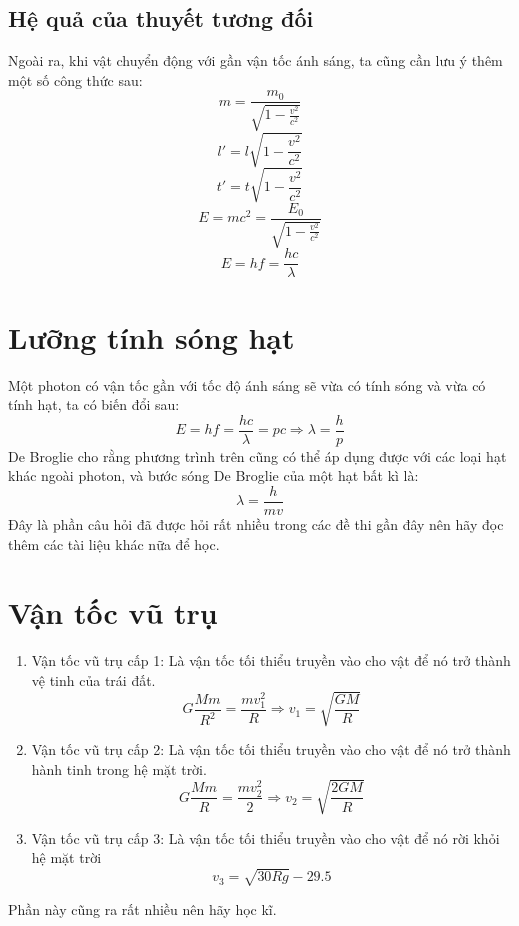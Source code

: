 \subsection{Hệ quả của thuyết tương đối}
Ngoài ra, khi vật chuyển động với gần vận tốc ánh sáng, ta cũng cần lưu ý thêm một số công thức sau:
$$m=\frac{m_{0}}{\sqrt{1-\frac{v^2}{c^2}}}$$
$$l'=l\sqrt{1-\frac{v^2}{c^2}}$$
$$t'=t\sqrt{1-\frac{v^2}{c^2}}$$
$$E=mc^2=\frac{E_{0}}{\sqrt{1-\frac{v^2}{c^2}}}$$
$$E=hf=\frac{hc}{\lambda}$$ 
\section{Lưỡng tính sóng hạt}
Một photon có vận tốc gần với tốc độ ánh sáng sẽ vừa có tính sóng và vừa có tính hạt, ta có biến đổi sau:
$$E=hf=\frac{hc}{\lambda}=pc\Rightarrow \lambda=\frac{h}{p}$$
De Broglie cho rằng phương trình trên cũng có thể áp dụng được với các loại hạt khác ngoài photon, và bước sóng De Broglie của một hạt bất kì là:
$$\lambda=\frac{h}{mv}$$
Đây là phần câu hỏi đã được hỏi rất nhiều trong các đề thi gần đây nên hãy đọc thêm các tài liệu khác nữa để học.
\section{Vận tốc vũ trụ}
\begin{enumerate}
    \item Vận tốc vũ trụ cấp 1: Là vận tốc tối thiểu truyền vào cho vật để nó trở thành vệ tinh của trái đất.
    $$G\frac{Mm}{R^2}=\frac{mv_{1}^2}{R}\Rightarrow v_{1}=\sqrt{\frac{GM}{R}}$$
    \item  Vận tốc vũ trụ cấp 2: Là vận tốc tối thiểu truyền vào cho vật để nó trở thành hành tinh trong hệ mặt trời.
    $$G\frac{Mm}{R}=\frac{mv_{2}^2}{2}\Rightarrow v_{2}=\sqrt{\frac{2GM}{R}}$$
    \item  Vận tốc vũ trụ cấp 3: Là vận tốc tối thiểu truyền vào cho vật để nó rời khỏi hệ mặt trời
    $$v_{3}=\sqrt{30Rg}-29.5$$
\end{enumerate}
Phần này cũng ra rất nhiều nên hãy học kĩ.
